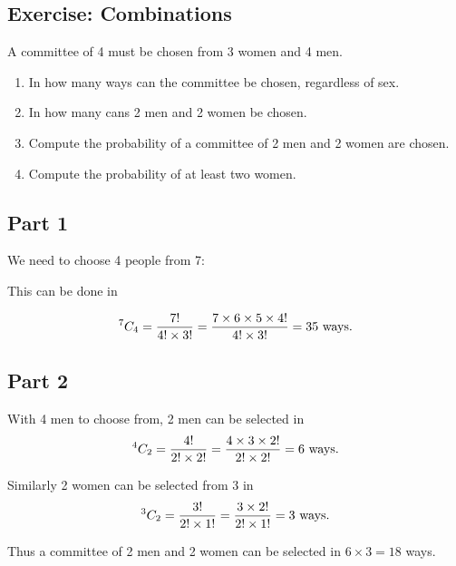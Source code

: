 \documentclass[]{report}
\begin{document}

\subsection*{Exercise: Combinations}

A committee of 4 must be chosen from 3 women and 4 men.

\begin{enumerate}[(1)]
\item In how many ways can the committee be chosen, regardless of sex.
\item In how many cans 2 men and 2 women be chosen.
\item Compute the probability of a committee of 2 men and 2 women are chosen.
\item Compute the probability of at least two women.
\end{enumerate}

\subsection*{Part 1}

We need to choose 4 people from 7:

This can be done in

\[
^7 C_4  = {7!  \over 4! \times 3!} =  {7 \times 6 \times 5 \times 4!  \over 4! \times 3!} = 35 \mbox{ ways.}
\]

\subsection*{Part 2}

With 4 men to choose from, 2 men can be selected in \[
^4 C_2  = {4!  \over 2! \times 2!} =  {4 \times 3 \times 2!  \over 2! \times 2!} = 6\mbox{ ways.}
\]

Similarly 2 women can be selected from 3 in
\[
^3 C_2  = {3!  \over 2! \times1!} =  {3 \times 2!  \over 2! \times 1!} = 3\mbox{ ways.}
\]


Thus a committee of 2 men and 2 women can be selected in $ 6 \times 3  = 18 $ ways.\\
\end{document}
